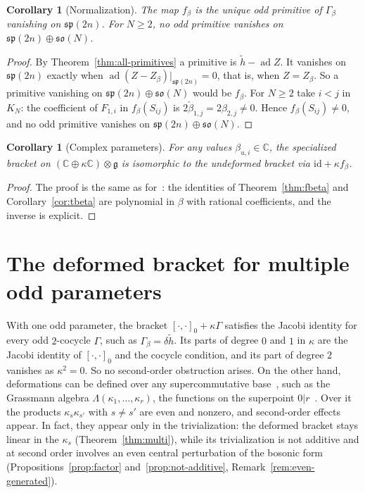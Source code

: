 \documentclass[11pt]{article}
\numberwithin{equation}{section}
\newtheorem{corollary}[theorem]{Corollary}
\theoremstyle{definition}
\theoremstyle{remark}
\newcommand{\ad}{\operatorname{ad}}
\begin{document}
\begin{corollary}[Normalization]\label{cor:normalization}
The map $f_\beta$ is the unique odd primitive of $\Gamma_\beta$ vanishing on $\mathfrak{sp}(2n)$.
For $N\geq2$, no odd primitive vanishes on $\mathfrak{sp}(2n)\oplus\mathfrak{so}(N)$.
\end{corollary}

\begin{proof}
By Theorem~\ref{thm:all-primitives} a primitive is $\tilde h-\ad Z$. It vanishes on
$\mathfrak{sp}(2n)$ exactly when $\ad(Z-Z_\beta)|_{\mathfrak{sp}(2n)}=0$, that is, when $Z=Z_\beta$. So a
primitive vanishing on $\mathfrak{sp}(2n)\oplus\mathfrak{so}(N)$ would be $f_\beta$.
For $N\geq2$ take $i<j$ in $K_N$: the coefficient of $F_{1,i}$ in $f_\beta(S_{ij})$ is
$2\check\beta_{1,j}=2\beta_{2,j}\neq0$. Hence $f_\beta(S_{ij})\neq0$, and no odd primitive vanishes on
$\mathfrak{sp}(2n)\oplus\mathfrak{so}(N)$.
\end{proof}

\begin{corollary}[Complex parameters]\label{cor:complex}
For any values $\beta_{u,i}\in\mathbb C$, the specialized bracket on
$(\mathbb C\oplus\kappa\mathbb C)\otimes\mathfrak g$ is isomorphic to the undeformed bracket
via $\mathrm{id}+\kappa f_\beta$.
\end{corollary}

\begin{proof}
The proof is the same as for~\cite[Corollary~4.2]{Aoi26}: the identities of Theorem~\ref{thm:fbeta} and
Corollary~\ref{cor:tbeta} are polynomial in $\beta$ with rational coefficients, and the inverse
is explicit.
\end{proof}

\section{The deformed bracket for multiple odd parameters}\label{sec:multi}

With one odd parameter, the bracket $[\cdot,\cdot]_0+\kappa\Gamma$ satisfies the Jacobi identity for
every odd $2$-cocycle $\Gamma$, such as $\Gamma_\beta=\delta\tilde h$. Its parts of degree $0$ and $1$ in
$\kappa$ are the Jacobi identity of $[\cdot,\cdot]_0$ and the cocycle condition, and its part of
degree $2$ vanishes as $\kappa^2=0$. So no second-order obstruction arises. On the other hand, deformations can be defined over
any supercommutative base~\cite[\S4.1]{Lei23}, such as the Grassmann algebra
$\Lambda(\kappa_1,\ldots,\kappa_r)$, the functions on the superpoint $0|r$~\cite[\S2.1]{Lei23}. Over it
the products $\kappa_s\kappa_{s'}$ with $s\neq s'$ are even and nonzero, and second-order effects appear.
In fact, they appear only in the trivialization: the deformed bracket stays linear in the $\kappa_s$
(Theorem~\ref{thm:multi}), while its trivialization is not additive and at second order involves an
even central perturbation of the bosonic form (Propositions~\ref{prop:factor} and~\ref{prop:not-additive}, Remark~\ref{rem:even-generated}).
\end{document}
